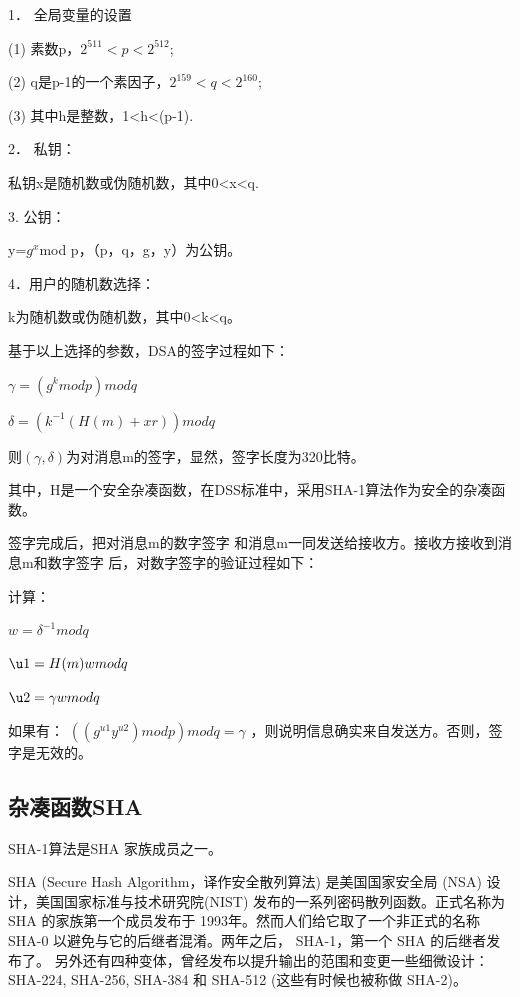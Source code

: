 \documentclass[UTF8,a4paper]{article}
\begin{document}
1．	全局变量的设置\par 
(1)	素数p，$2^{511}<p<2^{512}$;\par 
(2)	q是p-1的一个素因子，$2^{159}<q<2^{160}$;\par 
(3)	 其中h是整数，1<h<(p-1).\par 
2．	私钥：\par 
私钥x是随机数或伪随机数，其中0<x<q.\par 
3. 公钥：\par 
y=$g^{x}$mod p，（p，q，g，y）为公钥。\par 
4．用户的随机数选择：\par 
k为随机数或伪随机数，其中0<k<q。\par 
基于以上选择的参数，DSA的签字过程如下：\par 
\begin{center}
	$\gamma =(g^k mod p)mod q$\par 
	
	$\delta =(k^{-1}(H(m)+xr))mod q$\par 
\end{center}
 则$(\gamma,\delta)$为对消息m的签字，显然，签字长度为320比特。\par 
其中，H是一个安全杂凑函数，在DSS标准中，采用SHA-1算法作为安全的杂凑函数。\par 
签字完成后，把对消息m的数字签字 和消息m一同发送给接收方。接收方接收到消息m和数字签字 后，对数字签字的验证过程如下：\par 
 计算：\par 

\begin{center}
	$w=\delta ^{-1} mod q$\par 
	
	$\u1=H(m)w mod q$\par 
	$\u2=\gamma w mod q$\par 
\end{center}
 如果有： $((g^{u1}y^{u2})mod p)mod q=\gamma$ ，则说明信息确实来自发送方。否则，签字是无效的。\par 




\subsection{杂凑函数SHA}
SHA-1算法是SHA 家族成员之一。


SHA (Secure Hash Algorithm，译作安全散列算法) 是美国国家安全局 (NSA) 设计，美国国家标准与技术研究院(NIST) 发布的一系列密码散列函数。正式名称为 SHA 的家族第一个成员发布于 1993年。然而人们给它取了一个非正式的名称 SHA-0 以避免与它的后继者混淆。两年之后， SHA-1，第一个 SHA 的后继者发布了。 另外还有四种变体，曾经发布以提升输出的范围和变更一些细微设计： SHA-224, SHA-256, SHA-384 和 SHA-512 (这些有时候也被称做 SHA-2)。
\end{document}

